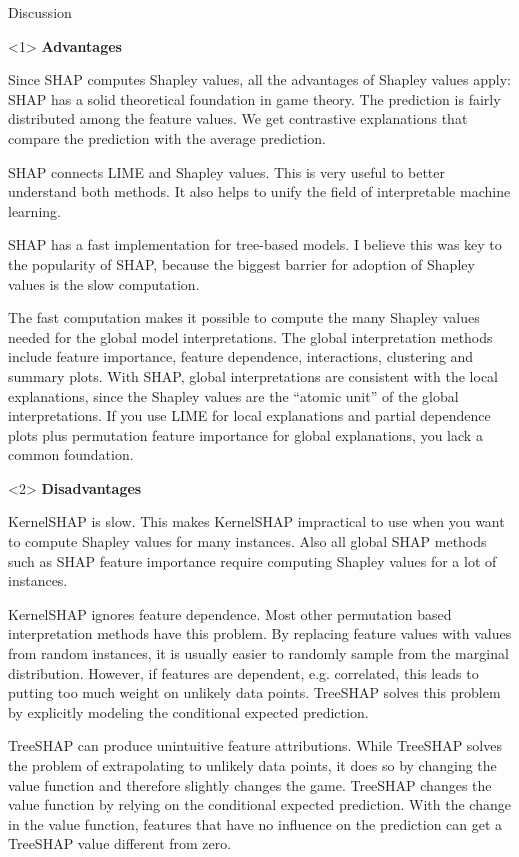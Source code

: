 \documentclass[10pt,compress,t,notes=noshow, xcolor=table]{beamer}
\begin{document}
\begin{vbframe}{Discussion}
\begin{onlyenv}<1>
\textbf{Advantages}

Since SHAP computes Shapley values, all the advantages of Shapley values apply: SHAP has a solid theoretical foundation in game theory. The prediction is fairly distributed among the feature values. We get contrastive explanations that compare the prediction with the average prediction.

SHAP connects LIME and Shapley values. This is very useful to better understand both methods. It also helps to unify the field of interpretable machine learning.

SHAP has a fast implementation for tree-based models. I believe this was key to the popularity of SHAP, because the biggest barrier for adoption of Shapley values is the slow computation.

The fast computation makes it possible to compute the many Shapley values needed for the global model interpretations. The global interpretation methods include feature importance, feature dependence, interactions, clustering and summary plots. With SHAP, global interpretations are consistent with the local explanations, since the Shapley values are the “atomic unit” of the global interpretations. If you use LIME for local explanations and partial dependence plots plus permutation feature importance for global explanations, you lack a common foundation.
\end{onlyenv}

\begin{onlyenv}<2>
\textbf{Disadvantages}

KernelSHAP is slow. This makes KernelSHAP impractical to use when you want to compute Shapley values for many instances. Also all global SHAP methods such as SHAP feature importance require computing Shapley values for a lot of instances.

KernelSHAP ignores feature dependence. Most other permutation based interpretation methods have this problem. By replacing feature values with values from random instances, it is usually easier to randomly sample from the marginal distribution. However, if features are dependent, e.g. correlated, this leads to putting too much weight on unlikely data points. TreeSHAP solves this problem by explicitly modeling the conditional expected prediction.

TreeSHAP can produce unintuitive feature attributions. While TreeSHAP solves the problem of extrapolating to unlikely data points, it does so by changing the value function and therefore slightly changes the game. TreeSHAP changes the value function by relying on the conditional expected prediction. With the change in the value function, features that have no influence on the prediction can get a TreeSHAP value different from zero.


\end{onlyenv}
\end{vbframe}
\end{document}
